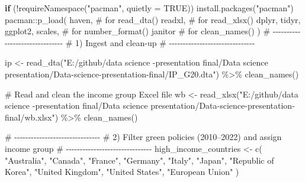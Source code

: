 \documentclass[
  letterpaper,
  DIV=11,
  numbers=noendperiod]{scrartcl}
\newenvironment{Shaded}{\begin{snugshade}}{\end{snugshade}}
\newcommand{\AttributeTok}[1]{\textcolor[rgb]{0.40,0.45,0.13}{#1}}
\newcommand{\CommentTok}[1]{\textcolor[rgb]{0.37,0.37,0.37}{#1}}
\newcommand{\ConstantTok}[1]{\textcolor[rgb]{0.56,0.35,0.01}{#1}}
\newcommand{\ControlFlowTok}[1]{\textcolor[rgb]{0.00,0.23,0.31}{\textbf{#1}}}
\newcommand{\FunctionTok}[1]{\textcolor[rgb]{0.28,0.35,0.67}{#1}}
\newcommand{\NormalTok}[1]{\textcolor[rgb]{0.00,0.23,0.31}{#1}}
\newcommand{\OtherTok}[1]{\textcolor[rgb]{0.00,0.23,0.31}{#1}}
\newcommand{\SpecialCharTok}[1]{\textcolor[rgb]{0.37,0.37,0.37}{#1}}
\newcommand{\StringTok}[1]{\textcolor[rgb]{0.13,0.47,0.30}{#1}}
\begin{document}
\begin{Shaded}
\begin{Highlighting}[]
\ControlFlowTok{if}\NormalTok{ (}\SpecialCharTok{!}\FunctionTok{requireNamespace}\NormalTok{(}\StringTok{"pacman"}\NormalTok{, }\AttributeTok{quietly =} \ConstantTok{TRUE}\NormalTok{)) }\FunctionTok{install.packages}\NormalTok{(}\StringTok{"pacman"}\NormalTok{)}
\NormalTok{pacman}\SpecialCharTok{::}\FunctionTok{p\_load}\NormalTok{(}
\NormalTok{  haven,      }\CommentTok{\# for read\_dta()}
\NormalTok{  readxl,     }\CommentTok{\# for read\_xlsx()}
\NormalTok{  dplyr,      }
\NormalTok{  tidyr,}
\NormalTok{  ggplot2,}
\NormalTok{  scales,     }\CommentTok{\# for number\_format()}
\NormalTok{  janitor     }\CommentTok{\# for clean\_names()}
\NormalTok{)}
\CommentTok{\# {-}{-}{-}{-}{-}{-}{-}{-}{-}{-}{-}{-}{-}{-}{-}{-}{-}{-}{-}{-}{-}{-}{-}{-}{-}{-}{-}{-}{-}{-}{-}}
\CommentTok{\#  1) Ingest and clean{-}up}
\CommentTok{\# {-}{-}{-}{-}{-}{-}{-}{-}{-}{-}{-}{-}{-}{-}{-}{-}{-}{-}{-}{-}{-}{-}{-}{-}{-}{-}{-}{-}{-}{-}{-}}

\NormalTok{ip }\OtherTok{\textless{}{-}} \FunctionTok{read\_dta}\NormalTok{(}\StringTok{"E:/github/data science {-}presentation final/Data science presentation/Data{-}science{-}presentation{-}final/IP\_G20.dta"}\NormalTok{) }\SpecialCharTok{\%\textgreater{}\%}
  \FunctionTok{clean\_names}\NormalTok{()}

\CommentTok{\# Read and clean the income group Excel file}
\NormalTok{wb }\OtherTok{\textless{}{-}} \FunctionTok{read\_xlsx}\NormalTok{(}\StringTok{"E:/github/data science {-}presentation final/Data science presentation/Data{-}science{-}presentation{-}final/wb.xlsx"}\NormalTok{) }\SpecialCharTok{\%\textgreater{}\%}
  \FunctionTok{clean\_names}\NormalTok{()}

\CommentTok{\# {-}{-}{-}{-}{-}{-}{-}{-}{-}{-}{-}{-}{-}{-}{-}{-}{-}{-}{-}{-}{-}{-}{-}{-}{-}{-}{-}{-}{-}{-}{-}}
\CommentTok{\#  2) Filter green policies (2010–2022) and assign income group }
\CommentTok{\# {-}{-}{-}{-}{-}{-}{-}{-}{-}{-}{-}{-}{-}{-}{-}{-}{-}{-}{-}{-}{-}{-}{-}{-}{-}{-}{-}{-}{-}{-}{-}}
\NormalTok{high\_income\_countries }\OtherTok{\textless{}{-}} \FunctionTok{c}\NormalTok{(}
  \StringTok{"Australia"}\NormalTok{, }\StringTok{"Canada"}\NormalTok{, }\StringTok{"France"}\NormalTok{, }\StringTok{"Germany"}\NormalTok{, }\StringTok{"Italy"}\NormalTok{,}
  \StringTok{"Japan"}\NormalTok{, }\StringTok{"Republic of Korea"}\NormalTok{, }\StringTok{"United Kingdom"}\NormalTok{, }\StringTok{"United States"}\NormalTok{, }\StringTok{"European Union"}
\NormalTok{)}


\end{Highlighting}
\end{Shaded}
\end{document}
